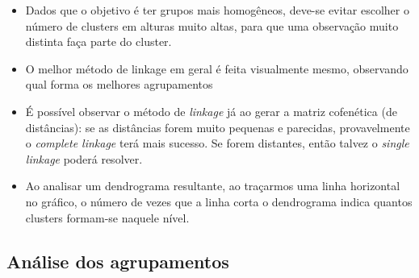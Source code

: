\documentclass[
  letterpaper,
  DIV=11,
  numbers=noendperiod]{scrreprt}
\providecommand{\tightlist}{%
  \setlength{\itemsep}{0pt}\setlength{\parskip}{0pt}}\usepackage{longtable,booktabs,array}
\begin{document}
\begin{itemize}
  \begin{itemize}
  \tightlist
  \item
    Dados que o objetivo é ter grupos mais homogêneos, deve-se evitar
    escolher o número de clusters em alturas muito altas, para que uma
    observação muito distinta faça parte do cluster.
  \item
    O melhor método de linkage em geral é feita visualmente mesmo,
    observando qual forma os melhores agrupamentos
  \item
    É possível observar o método de \emph{linkage} já ao gerar a matriz
    cofenética (de distâncias): se as distâncias forem muito pequenas e
    parecidas, provavelmente o \emph{complete linkage} terá mais
    sucesso. Se forem distantes, então talvez o \emph{single linkage}
    poderá resolver.
  \item
    Ao analisar um dendrograma resultante, ao traçarmos uma linha
    horizontal no gráfico, o número de vezes que a linha corta o
    dendrograma indica quantos clusters formam-se naquele nível.
  \end{itemize}
\end{itemize}

\hypertarget{anuxe1lise-dos-agrupamentos}{%
\subsection{Análise dos
agrupamentos}\label{anuxe1lise-dos-agrupamentos}}
\end{document}

